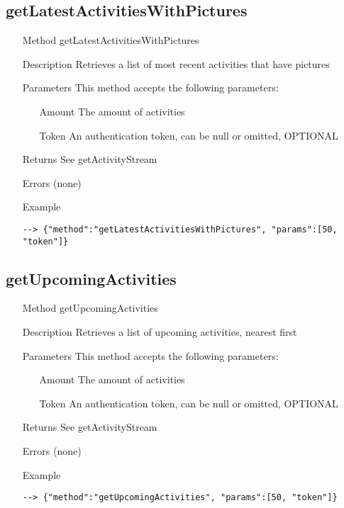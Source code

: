 \documentclass[a4paper]{scrreprt}
\begin{document}
\clearpage

\subsection{getLatestActivitiesWithPictures}
\begin{enumerate}
\item[Method] getLatestActivitiesWithPictures
\item[Description] Retrieves a list of most recent activities that have pictures
\item[Parameters] This method accepts the following parameters:
	\begin{enumerate}
		\item[Amount] The amount of activities
        \item[Token] An authentication token, can be null or omitted, OPTIONAL
    \end{enumerate}
\item[Returns] See getActivityStream
\item[Errors] (none)
\item[Example]
\begin{lstlisting}
--> {"method":"getLatestActivitiesWithPictures", "params":[50, "token"]}
\end{lstlisting}
\end{enumerate}


\subsection{getUpcomingActivities}
\begin{enumerate}
\item[Method] getUpcomingActivities
\item[Description] Retrieves a list of upcoming activities, nearest first
\item[Parameters] This method accepts the following parameters:
	\begin{enumerate}
		\item[Amount] The amount of activities 
        \item[Token] An authentication token, can be null or omitted, OPTIONAL
    \end{enumerate}
\item[Returns] See getActivityStream
\item[Errors] (none)
\item[Example]
\begin{lstlisting}
--> {"method":"getUpcomingActivities", "params":[50, "token"]}
\end{lstlisting}
\end{enumerate}
\end{document}
